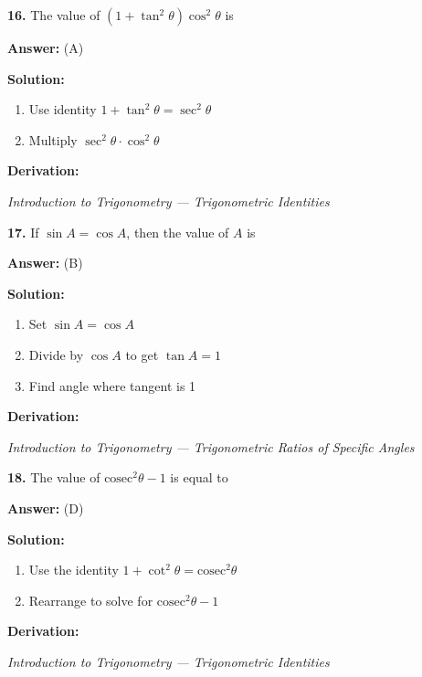 \documentclass[12pt,a4paper]{exam}
\newcommand{\fitmath}[1]{%
  \sbox{\schmathbox}{$\displaystyle #1$}%
  \ifdim\wd\schmathbox>\linewidth
    \resizebox{\linewidth}{!}{\usebox{\schmathbox}}%
  \else
    \usebox{\schmathbox}%
  \fi}
\begin{document}
\begin{questions}
\question \textbf{16.} The value of $(1 + \tan^2 \theta) \cos^2 \theta$ is

\textbf{Answer:}
(A)

\textbf{Solution:}
\begin{enumerate}
  \item Use identity $1 + \tan^2 \theta = \sec^2 \theta$
  \item Multiply $\sec^2 \theta \cdot \cos^2 \theta$
\end{enumerate}
\textbf{Derivation:}
\begin{center}
\fitmath{\sec^2 \theta \cdot \cos^2 \theta = \frac{1}{\cos^2 \theta} \cdot \cos^2 \theta = 1}
\end{center}
\hfill \textit{Introduction to Trigonometry — Trigonometric Identities}
\vspace{0.3cm}

\question \textbf{17.} If $\sin A = \cos A$, then the value of $A$ is

\textbf{Answer:}
(B)

\textbf{Solution:}
\begin{enumerate}
  \item Set $\sin A = \cos A$
  \item Divide by $\cos A$ to get $\tan A = 1$
  \item Find angle where tangent is 1
\end{enumerate}
\textbf{Derivation:}
\begin{center}
\fitmath{\begin{aligned}
\tan A = 1 \\
\implies A = 45^\circ
\end{aligned}}
\end{center}
\hfill \textit{Introduction to Trigonometry — Trigonometric Ratios of Specific Angles}
\vspace{0.3cm}

\question \textbf{18.} The value of $\text{cosec}^2 \theta - 1$ is equal to

\textbf{Answer:}
(D)

\textbf{Solution:}
\begin{enumerate}
  \item Use the identity $1 + \cot^2 \theta = \text{cosec}^2 \theta$
  \item Rearrange to solve for $\text{cosec}^2 \theta - 1$
\end{enumerate}
\textbf{Derivation:}
\begin{center}
\fitmath{\text{cosec}^2 \theta - 1 = \cot^2 \theta}
\end{center}
\hfill \textit{Introduction to Trigonometry — Trigonometric Identities}
\vspace{0.3cm}


\end{questions}
\end{document}
